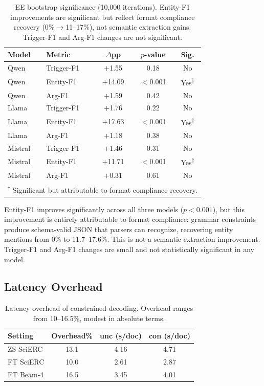\documentclass[11pt]{article}
\newcommand{\rmark}[1]{\textsuperscript{#1}}
\begin{document}
\begin{table}[t]
\centering
\small
\caption{EE bootstrap significance (10,000 iterations). Entity-F1 improvements are significant but reflect format compliance recovery (0\%$\to$11--17\%), not semantic extraction gains. Trigger-F1 and Arg-F1 changes are not significant.}
\label{tab:bootstrap_ee}
\begin{tabular}{llccc}
\toprule
\textbf{Model} & \textbf{Metric} & \textbf{$\Delta$pp} & \textbf{$p$-value} & \textbf{Sig.} \\
\midrule
Qwen    & Trigger-F1 & $+$1.55 & 0.18    & No \\
Qwen    & Entity-F1  & $+$14.09 & $<$0.001 & Yes\rmark{$\dagger$} \\
Qwen    & Arg-F1     & $+$1.59 & 0.42    & No \\
\midrule
Llama   & Trigger-F1 & $+$1.76 & 0.22    & No \\
Llama   & Entity-F1  & $+$17.63 & $<$0.001 & Yes\rmark{$\dagger$} \\
Llama   & Arg-F1     & $+$1.18 & 0.38    & No \\
\midrule
Mistral & Trigger-F1 & $+$1.46 & 0.31    & No \\
Mistral & Entity-F1  & $+$11.71 & $<$0.001 & Yes\rmark{$\dagger$} \\
Mistral & Arg-F1     & $+$0.31 & 0.61    & No \\
\bottomrule
\multicolumn{5}{l}{\footnotesize\rmark{$\dagger$} Significant but attributable to format compliance recovery.}
\end{tabular}
\end{table}

Entity-F1 improves significantly across all three models ($p < 0.001$), but this improvement is entirely attributable to format compliance: grammar constraints produce schema-valid JSON that parsers can recognize, recovering entity mentions from 0\% to 11.7--17.6\%.
This is not a semantic extraction improvement.
Trigger-F1 and Arg-F1 changes are small and not statistically significant in any model.


\subsection{Latency Overhead}
\label{sec:latency}

\begin{table}[t]
\centering
\small
\caption{Latency overhead of constrained decoding. Overhead ranges from 10--16.5\%, modest in absolute terms.}
\label{tab:latency}
\begin{tabular}{lccc}
\toprule
\textbf{Setting} & \textbf{Overhead\%} & \textbf{unc (s/doc)} & \textbf{con (s/doc)} \\
\midrule
ZS SciERC   & 13.1 & 4.16 & 4.71 \\
FT SciERC   & 10.0 & 2.61 & 2.87 \\
FT Beam-4   & 16.5 & 3.45 & 4.01 \\
\bottomrule
\end{tabular}
\end{table}
\end{document}
